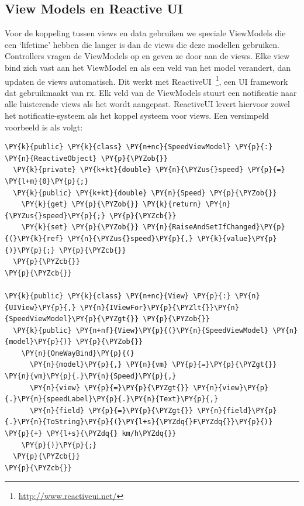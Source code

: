 \subsection{View Models en Reactive UI} 
\label{sec:vm-reactive-ui}

Voor de koppeling tussen views en data gebruiken we speciale ViewModels die een `lifetime' hebben die langer is dan de views die deze modellen gebruiken. Controllers vragen de ViewModels op en geven ze door aan de views. Elke view bind zich vast aan het ViewModel en als een veld van het model verandert, dan updaten de views automatisch. Dit werkt met ReactiveUI~\footnote{\url{http://www.reactiveui.net/}}, een UI framework dat gebruikmaakt van \ac{rx}. Elk veld van de ViewModels stuurt een notificatie naar alle luisterende views als het wordt aangepast. ReactiveUI levert hiervoor zowel het notificatie-systeem als het koppel systeem voor views. Een versimpeld voorbeeld is als volgt:




\begin{Verbatim}[commandchars=\\\{\}]
\PY{k}{public} \PY{k}{class} \PY{n+nc}{SpeedViewModel} \PY{p}{:} \PY{n}{ReactiveObject} \PY{p}{\PYZob{}}
  \PY{k}{private} \PY{k+kt}{double} \PY{n}{\PYZus{}speed} \PY{p}{=} \PY{l+m}{0}\PY{p}{;}
  \PY{k}{public} \PY{k+kt}{double} \PY{n}{Speed} \PY{p}{\PYZob{}}
    \PY{k}{get} \PY{p}{\PYZob{}} \PY{k}{return} \PY{n}{\PYZus{}speed}\PY{p}{;} \PY{p}{\PYZcb{}}
    \PY{k}{set} \PY{p}{\PYZob{}} \PY{n}{RaiseAndSetIfChanged}\PY{p}{(}\PY{k}{ref} \PY{n}{\PYZus{}speed}\PY{p}{,} \PY{k}{value}\PY{p}{)}\PY{p}{;} \PY{p}{\PYZcb{}}
  \PY{p}{\PYZcb{}}
\PY{p}{\PYZcb{}}

\PY{k}{public} \PY{k}{class} \PY{n+nc}{View} \PY{p}{:} \PY{n}{UIView}\PY{p}{,} \PY{n}{IViewFor}\PY{p}{\PYZlt{}}\PY{n}{SpeedViewModel}\PY{p}{\PYZgt{}} \PY{p}{\PYZob{}}
  \PY{k}{public} \PY{n+nf}{View}\PY{p}{(}\PY{n}{SpeedViewModel} \PY{n}{model}\PY{p}{)} \PY{p}{\PYZob{}}
    \PY{n}{OneWayBind}\PY{p}{(}
      \PY{n}{model}\PY{p}{,} \PY{n}{vm} \PY{p}{=}\PY{p}{\PYZgt{}} \PY{n}{vm}\PY{p}{.}\PY{n}{Speed}\PY{p}{,}
      \PY{n}{view} \PY{p}{=}\PY{p}{\PYZgt{}} \PY{n}{view}\PY{p}{.}\PY{n}{speedLabel}\PY{p}{.}\PY{n}{Text}\PY{p}{,}
      \PY{n}{field} \PY{p}{=}\PY{p}{\PYZgt{}} \PY{n}{field}\PY{p}{.}\PY{n}{ToString}\PY{p}{(}\PY{l+s}{\PYZdq{}F\PYZdq{}}\PY{p}{)} \PY{p}{+} \PY{l+s}{\PYZdq{} km/h\PYZdq{}}
    \PY{p}{)}\PY{p}{;}
  \PY{p}{\PYZcb{}}
\PY{p}{\PYZcb{}}
\end{Verbatim}

